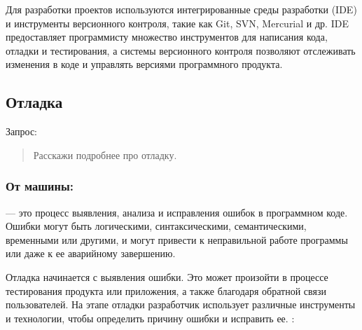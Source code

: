 \documentclass[letterpaper,10pt,russian]{sphinxmanual}
\begin{document}
\sphinxAtStartPar
Для разработки проектов используются интегрированные среды разработки (IDE) и инструменты версионного контроля, такие как Git, SVN, Mercurial и др. IDE предоставляет программисту множество инструментов для написания кода, отладки и тестирования, а системы версионного контроля позволяют отслеживать изменения в коде и управлять версиями программного продукта.


\subsection{Отладка}
\label{\detokenize{educational_materials/stages/content:id13}}
\sphinxAtStartPar
Запрос:
\begin{quote}

\sphinxAtStartPar
Расскажи подробнее про отладку.
\end{quote}


\subsubsection{От машины:}
\label{\detokenize{educational_materials/stages/content:id14}}
\sphinxAtStartPar
{} — это процесс выявления, анализа и исправления ошибок в программном коде. Ошибки могут быть логическими, синтаксическими, семантическими, временными или другими, и могут привести к неправильной работе программы или даже к ее аварийному завершению.

\sphinxAtStartPar
Отладка начинается с выявления ошибки. Это может произойти в процессе тестирования продукта или приложения, а также благодаря обратной связи пользователей. На этапе отладки разработчик использует различные инструменты и технологии, чтобы определить причину ошибки и исправить ее. : 
\end{document}
